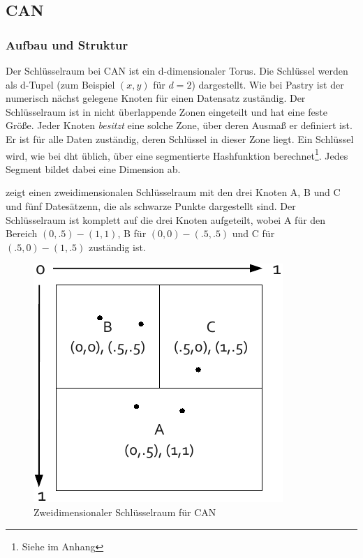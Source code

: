 \subsection{CAN}
\label{chap:evaluation_can}

\subsubsection{Aufbau und Struktur}
Der Schlüsselraum bei CAN \cite{Ratnasamy2001Scalable} ist ein d-dimensionaler Torus. Die Schlüssel werden als d-Tupel (zum Beispiel $(x,y)$ für $d=2$) dargestellt. Wie bei Pastry ist der numerisch nächst gelegene Knoten für einen Datensatz zuständig. Der Schlüsselraum ist in nicht überlappende Zonen eingeteilt und hat eine feste Größe. Jeder Knoten \emph{besitzt} eine solche Zone, über deren Ausmaß er definiert ist. Er ist für alle Daten zuständig, deren Schlüssel in dieser Zone liegt. Ein Schlüssel wird, wie bei \ac{dht} üblich, über eine segmentierte Hashfunktion berechnet\footnote{Siehe  im Anhang}. Jedes Segment bildet dabei eine Dimension ab.

 zeigt einen zweidimensionalen Schlüsselraum mit den drei Knoten A, B und C und fünf Datesätzenn, die als schwarze Punkte dargestellt sind. Der Schlüsselraum ist komplett auf die drei Knoten aufgeteilt, wobei A für den Bereich $(0, .5)-(1, 1)$, B für $(0, 0)-(.5, .5)$ und C für $(.5, 0)-(1, .5)$ zuständig ist.

\begin{figure}[htbp]
\centering
\includegraphics{grafics/can_key_space.pdf}
\caption{Zweidimensionaler Schlüsselraum für CAN}
\label{fig:can_key_space}
\end{figure}


